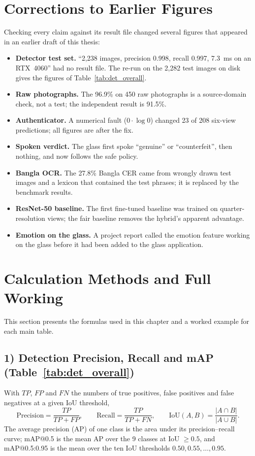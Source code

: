 \section{Corrections to Earlier Figures}
\label{sec:corrections}
Checking every claim against its result file changed several figures that appeared in an earlier draft of this thesis:
\begin{itemize}[noitemsep]
    \item \textbf{Detector test set.} ``2,238 images, precision 0.998, recall 0.997, 7.3~ms on an RTX~4060'' had no result file. The re-run on the 2,282 test images on disk gives the figures of Table~\ref{tab:det_overall}.
    \item \textbf{Raw photographs.} The 96.9\% on 450 raw photographs is a source-domain check, not a test; the independent result is 91.5\%.
    \item \textbf{Authenticator.} A numerical fault ($0\cdot\log 0$) changed 23 of 208 six-view predictions; all figures are after the fix.
    \item \textbf{Spoken verdict.} The glass first spoke ``genuine'' or ``counterfeit'', then nothing, and now follows the safe policy.
    \item \textbf{Bangla OCR.} The 27.8\% Bangla CER came from wrongly drawn test images and a lexicon that contained the test phrases; it is replaced by the benchmark results.
    \item \textbf{ResNet-50 baseline.} The first fine-tuned baseline was trained on quarter-resolution views; the fair baseline removes the hybrid's apparent advantage.
    \item \textbf{Emotion on the glass.} A project report called the emotion feature working on the glass before it had been added to the glass application.
\end{itemize}

\section*{Calculation Methods and Full Working}

This section presents the formulas used in this chapter and a worked example for each main table.

\subsection*{1) Detection Precision, Recall and mAP (Table~\ref{tab:det_overall})}
With $TP$, $FP$ and $FN$ the numbers of true positives, false positives and false negatives at a given IoU threshold,
\[
\text{Precision} = \frac{TP}{TP+FP}, \qquad \text{Recall} = \frac{TP}{TP+FN}, \qquad
\text{IoU}(A,B) = \frac{|A\cap B|}{|A\cup B|}.
\]
The average precision (AP) of one class is the area under its precision--recall curve; mAP@0.5 is the mean AP over the 9 classes at IoU $\geq 0.5$, and mAP@0.5:0.95 is the mean over the ten IoU thresholds $0.50, 0.55, \dots, 0.95$.

